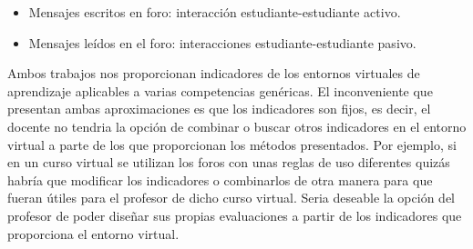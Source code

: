 \begin{itemize}
\item Mensajes escritos en foro: interacción estudiante-estudiante activo.
\item Mensajes leídos en el foro:  interacciones estudiante-estudiante pasivo.
\end{itemize}

Ambos trabajos nos proporcionan indicadores de los entornos virtuales de aprendizaje aplicables a varias competencias genéricas. El inconveniente que presentan ambas aproximaciones es que los indicadores son fijos, es decir, el docente no tendria la opción de combinar o buscar otros indicadores en el entorno virtual a parte de los que proporcionan los métodos presentados. Por ejemplo, si en un curso virtual se utilizan los foros con unas reglas de uso diferentes quizás habría que modificar los indicadores o combinarlos de otra manera para que fueran útiles para el profesor de dicho curso virtual. Seria deseable la opción del profesor de poder diseñar sus propias evaluaciones a partir de los indicadores que proporciona el entorno virtual.


